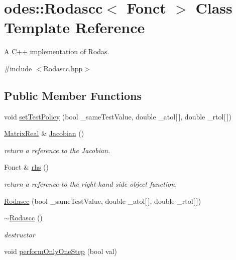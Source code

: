 \hypertarget{classodes_1_1Rodascc}{\section{odes\-:\-:Rodascc$<$ Fonct $>$ Class Template Reference}
\label{classodes_1_1Rodascc}
}


A C++ implementation of Rodas.  




{\ttfamily \#include $<$Rodascc.\-hpp$>$}

\subsection*{Public Member Functions}
\begin{DoxyCompactItemize}
\item 
void \hyperlink{classodes_1_1Rodascc_af9dfc8ae27717f632ec2fd83bd242cc8}{set\-Test\-Policy} (bool \-\_\-same\-Test\-Value, double \-\_\-atol\mbox{[}$\,$\mbox{]}, double \-\_\-rtol\mbox{[}$\,$\mbox{]})
\item 
\hyperlink{classodes_1_1Rodascc_a60e15e5d87729cc221d2181ecf03d0f8}{Matrix\-Real} \& \hyperlink{classodes_1_1Rodascc_afdb67906908cc997844cadeb4a4be42f}{Jacobian} ()
\begin{DoxyCompactList}\small\item\em return a reference to the Jacobian. \end{DoxyCompactList}\item 
Fonct \& \hyperlink{classodes_1_1Rodascc_acec83b0ef026430a35baf93b1cfd99c8}{rhs} ()
\begin{DoxyCompactList}\small\item\em return a reference to the right-\/hand side object function. \end{DoxyCompactList}\item 
\hyperlink{classodes_1_1Rodascc_a6d03e1be45c9dda99cb524c747887ff6}{Rodascc} (bool \-\_\-same\-Test\-Value, double \-\_\-atol\mbox{[}$\,$\mbox{]}, double \-\_\-rtol\mbox{[}$\,$\mbox{]})
\item 
\hyperlink{classodes_1_1Rodascc_a3de957ecc8fbc4b5a5c090ea58d92ae5}{$\sim$\-Rodascc} ()
\begin{DoxyCompactList}\small\item\em destructor \end{DoxyCompactList}\item 
void \hyperlink{classodes_1_1Rodascc_ac4ba0e7e7018009cf8db64f6898bd640}{perform\-Only\-One\-Step} (bool val)

\end{DoxyCompactItemize}
